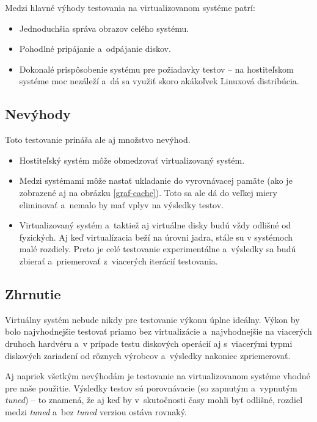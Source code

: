 Medzi hlavné výhody testovania na virtualizovanom systéme patrí:

\begin{itemize}
    \item Jednoduchšia správa obrazov celého systému.
    \item Pohodlné pripájanie a~odpájanie diskov.
    \item Dokonalé prispôsobenie systému pre požiadavky testov -- na
    hostiteľskom systéme moc nezáleží a~dá sa využiť skoro akákoľvek Linuxová
    distribúcia.
\end{itemize}

\subsection{Nevýhody}

Toto testovanie prináša ale aj množstvo nevýhod. 

\begin{itemize}
    \item Hostiteľský systém môže obmedzovať virtualizovaný systém.
    \item Medzi systémami môže nastať ukladanie do vyrovnávacej pamäte (ako je zobrazené aj na obrázku
    \ref{graf-cache}). Toto sa ale dá do veľkej miery eliminovať a~nemalo by
    mať vplyv na výsledky testov.
    \item Virtualizovaný systém a~taktiež aj virtuálne disky budú vždy odlišné
    od fyzických. Aj keď virtualízacia beží na úrovni jadra, stále su v
    systémoch malé rozdiely. Preto je celé testovanie experimentálne a~výsledky
    sa budú zbierať a~priemerovať z~viacerých iterácií testovania.
\end{itemize}

\subsection{Zhrnutie}

Virtuálny systém nebude nikdy pre testovanie výkonu úplne ideálny. Výkon by
bolo najvhodnejšie testovať priamo bez virtualizácie a~najvhodnejšie na
viacerých druhoch hardvéru a~v prípade testu diskových operácií aj s~viacerými
typmi diskových zariadení od rôznych výrobcov a~výsledky nakoniec zpriemerovať.  

Aj napriek všetkým nevýhodám je testovanie na virtualizovanom systéme vhodné
pre naše použitie.  Výsledky testov sú porovnávacie (so zapnutým a~vypnutým
\emph{tuned}) -- to znamená, že aj keď by v~skutočnosti časy mohli byť odlišné,
rozdiel medzi \emph{tuned} a~bez \emph{tuned} verziou ostáva rovnaký.

